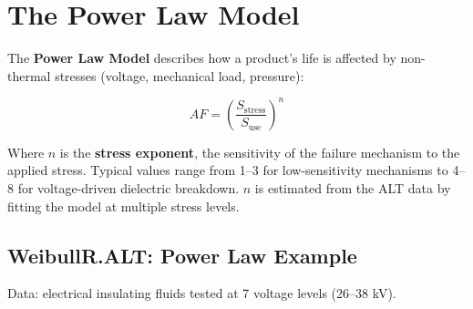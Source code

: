 \documentclass[
  letterpaper,
  DIV=11,
  numbers=noendperiod]{scrreprt}
\newenvironment{Shaded}{\begin{snugshade}}{\end{snugshade}}
\newcommand{\AttributeTok}[1]{\textcolor[rgb]{0.40,0.45,0.13}{#1}}
\newcommand{\DecValTok}[1]{\textcolor[rgb]{0.68,0.00,0.00}{#1}}
\newcommand{\FunctionTok}[1]{\textcolor[rgb]{0.28,0.35,0.67}{#1}}
\newcommand{\NormalTok}[1]{\textcolor[rgb]{0.00,0.23,0.31}{#1}}
\newcommand{\OtherTok}[1]{\textcolor[rgb]{0.00,0.23,0.31}{#1}}
\newcommand{\SpecialCharTok}[1]{\textcolor[rgb]{0.37,0.37,0.37}{#1}}
\newcommand{\StringTok}[1]{\textcolor[rgb]{0.13,0.47,0.30}{#1}}
\begin{document}
\section{The Power Law Model}\label{the-power-law-model}

The \textbf{Power Law Model} describes how a product's life is affected
by non-thermal stresses (voltage, mechanical load, pressure):

\[AF = \left(\frac{S_{\text{stress}}}{S_{\text{use}}}\right)^{n}\]

Where \(n\) is the \textbf{stress exponent}, the sensitivity of the
failure mechanism to the applied stress. Typical values range from 1--3
for low-sensitivity mechanisms to 4--8 for voltage-driven dielectric
breakdown. \(n\) is estimated from the ALT data by fitting the model at
multiple stress levels.

\subsection{WeibullR.ALT: Power Law
Example}\label{weibullr.alt-power-law-example}

Data: electrical insulating fluids tested at 7 voltage levels (26--38
kV).

\begin{Shaded}
\end{Shaded}
\end{document}
